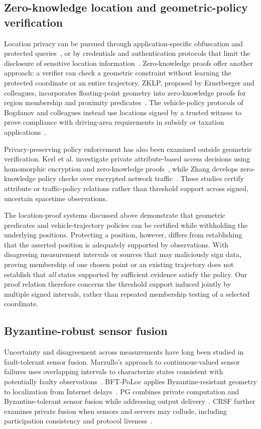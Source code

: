 \subsection{Zero-knowledge location and geometric-policy verification}
Location privacy can be pursued through application-specific obfuscation and protected queries~\cite{Mdee2022,Atmaca2024}, or by credentials and authentication protocols that limit the disclosure of sensitive location information~\cite{Ghani2025,Zhang2025Sybil,Wang2025ZKAuth}. Zero-knowledge proofs offer another approach: a verifier can check a geometric constraint without learning the protected coordinate or an entire trajectory. ZKLP, proposed by Ernstberger and colleagues, incorporates floating-point geometry into zero-knowledge proofs for region membership and proximity predicates~\cite{ZKLP}. The vehicle-policy protocols of Bogdanov and colleagues instead use locations signed by a trusted witness to prove compliance with driving-area requirements in subsidy or taxation applications~\cite{VehiclePolicy}.

Privacy-preserving policy enforcement has also been examined outside geometric verification. Kerl et al. investigate private attribute-based access decisions using homomorphic encryption and zero-knowledge proofs~\cite{CybersecKerl2025}, while Zhang develops zero-knowledge policy checks over encrypted network traffic~\cite{CybersecZhang2026}. These studies certify attribute or traffic-policy relations rather than threshold support across signed, uncertain spacetime observations.

The location-proof systems discussed above demonstrate that geometric predicates and vehicle-trajectory policies can be certified while withholding the underlying positions. Protecting a position, however, differs from establishing that the asserted position is adequately supported by observations. With disagreeing measurement intervals or sources that may maliciously sign data, proving membership of one chosen point or an existing trajectory does not establish that \emph{all} states supported by sufficient evidence satisfy the policy. Our proof relation therefore concerns the threshold support induced jointly by multiple signed intervals, rather than repeated membership testing of a selected coordinate.

\subsection{Byzantine-robust sensor fusion}
Uncertainty and disagreement across measurements have long been studied in fault-tolerant sensor fusion. Marzullo's approach to continuous-valued sensor failures uses overlapping intervals to characterize states consistent with potentially faulty observations~\cite{Marzullo1990}. BFT-PoLoc applies Byzantine-resistant geometry to localization from Internet delays~\cite{BFTPoLoc}. PG combines private computation and Byzantine-tolerant sensor fusion while addressing output delivery~\cite{PG}. CRSF further examines private fusion when sensors and servers may collude, including participation consistency and protocol liveness~\cite{CRSF}.

